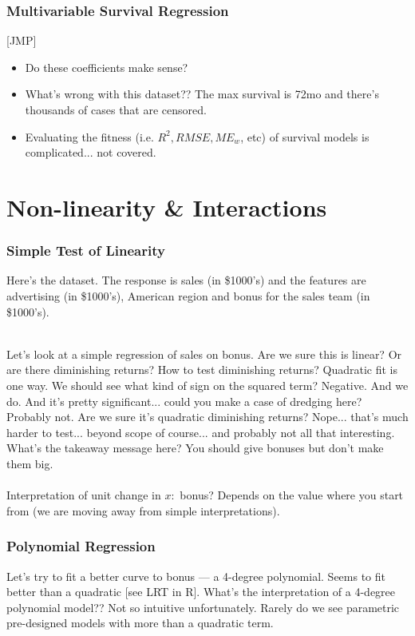 \documentclass[handout]{beamer}
\begin{document}
\begin{frame}\frametitle{Multivariable Survival Regression}

[JMP] 
\begin{itemize}
\item Do these coefficients make sense? \pause 
\item What's wrong with this dataset?? \pause The max survival is 72mo and there's thousands of cases that are censored. \pause
\item Evaluating the fitness (i.e. $R^2, RMSE, ME_w$, etc) of survival models is complicated... not covered.
\end{itemize}	
\end{frame}

\section{Non-linearity \& Interactions}

\begin{frame}\frametitle{Simple Test of Linearity}

Here's the  dataset. The response is sales (in \$1000's) and the features are advertising (in \$1000's), American region and bonus for the sales team (in \$1000's). \\~\\ \pause

Let's look at a simple regression of sales on bonus. \pause Are we sure this is linear? Or are there diminishing returns? How to test diminishing returns? \pause Quadratic fit is one way. We should see what kind of sign on the squared term? \pause Negative. And we do. And it's pretty significant... could you make a case of dredging here? \pause Probably not. Are we sure it's quadratic diminishing returns? \pause Nope... that's much harder to test... beyond scope of course... and probably not all that interesting. \pause What's the takeaway message here? \pause You should give bonuses but don't make them  big. \\~\\

\small
Interpretation of unit change in $x:$ bonus? Depends on the value where you start from (we are moving away from simple interpretations).
	
\end{frame}


\begin{frame}\frametitle{Polynomial Regression}

Let's try to fit a better curve to bonus --- a 4-degree polynomial. Seems to fit better than a quadratic [see LRT in R]. What's the interpretation of a 4-degree polynomial model?? \pause Not so intuitive unfortunately. Rarely do we see parametric pre-designed models with more than a quadratic term.

\end{frame}
\end{document}
